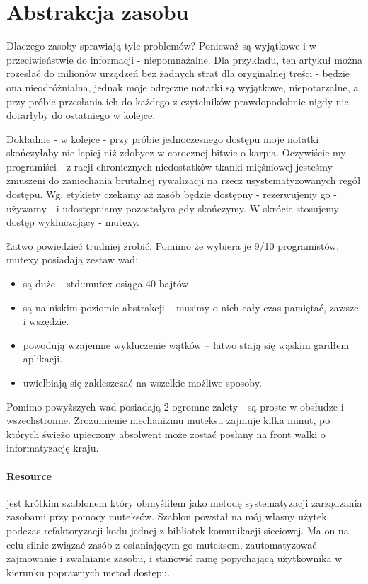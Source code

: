 \section{Abstrakcja zasobu}\label{sec:resource}
Dlaczego zasoby sprawiają tyle problemów? Ponieważ są wyjątkowe i w przeciwieństwie do informacji - niepomnażalne. Dla przykładu, ten artykuł można rozesłać do milionów urządzeń bez żadnych strat dla oryginalnej treści - będzie ona nieodróżnialna, jednak moje odręczne notatki są wyjątkowe, niepotarzalne, a przy próbie przesłania ich do każdego z czytelników prawdopodobnie nigdy nie dotarłyby do ostatniego w kolejce.

Dokładnie - w kolejce - przy próbie jednoczesnego dostępu moje notatki skończyłaby nie lepiej niż zdobycz w corocznej bitwie o karpia. Oczywiście my - programiści - z racji chronicznych niedostatków tkanki mięśniowej jesteśmy zmuszeni do zaniechania brutalnej rywalizacji na rzecz usystematyzowanych regół dostępu. Wg. etykiety czekamy aż zasób będzie dostępny - rezerwujemy go - używamy - i udostępniamy pozostałym gdy skończymy. W skrócie stosujemy dostęp wykluczający - mutexy.

Łatwo powiedzieć trudniej zrobić. Pomimo że wybiera je 9/10 programistów, mutexy posiadają zestaw wad:
\begin{itemize}
\item są duże -- std::mutex osiąga 40 bajtów
\item są na niskim poziomie abstrakcji -- musimy o nich cały czas pamiętać, zawsze i wszędzie.
\item powodują wzajemne wykluczenie wątków -- łatwo stają się wąskim gardłem aplikacji.
\item uwielbiają się zakleszczać na wszelkie możliwe sposoby.
\end{itemize}
Pomimo powyższych wad posiadają 2 ogromne zalety - są proste w obsłudze i wszechstronne. Zrozumienie mechanizmu muteksu zajmuje kilka minut, po których świeżo upieczony absolwent może zostać posłany na front walki o informatyzację kraju.

\paragraph{Resource}
 jest krótkim szablonem który obmyśliłem jako metodę systematyzacji zarządzania zasobami przy pomocy muteksów. Szablon powstał na mój własny użytek podczas refaktoryzacji kodu jednej z bibliotek komunikacji sieciowej. Ma on na celu silnie związać zasób z osłaniającym go muteksem, zautomatyzować zajmowanie i zwalnianie zasobu, i stanowić ramę popychającą użytkownika w kierunku poprawnych metod dostępu.

